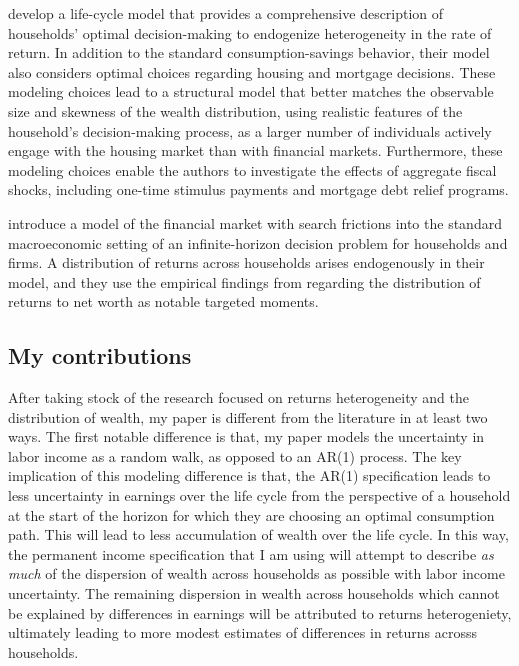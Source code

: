 \par \cite{Guler2022} develop a life-cycle model that provides a comprehensive description of households' optimal decision-making to endogenize heterogeneity in the rate of return. In addition to the standard consumption-savings behavior, their model also considers optimal choices regarding housing and mortgage decisions. These modeling choices lead to a structural model that better matches the observable size and skewness of the wealth distribution, using realistic features of the household's decision-making process, as a larger number of individuals actively engage with the housing market than with financial markets. Furthermore, these modeling choices enable the authors to investigate the effects of aggregate fiscal shocks, including one-time stimulus payments and mortgage debt relief programs.

\par \cite{Menzio2025} introduce a model of the financial market with search frictions into the standard macroeconomic setting of an infinite-horizon decision problem for households and firms. A distribution of returns across households arises endogenously in their model, and they use the empirical findings from \cite{aflgdmlp20} regarding the distribution of returns to net worth as notable targeted moments.

\subsection{My contributions}

\par After taking stock of the research focused on returns heterogeneity and the distribution of wealth, my paper is different from the literature in at least two ways. The first notable difference is that, my paper models the uncertainty in labor income as a random walk, as opposed to an AR(1) process. The key implication of this modeling difference is that, the AR(1) specification leads to less uncertainty in earnings over the life cycle from the perspective of a household at the start of the horizon for which they are choosing an optimal consumption path. This will lead to less accumulation of wealth over the life cycle. In this way, the permanent income specification that I am using will attempt to describe \textit{as much} of the dispersion of wealth across households as possible with labor income uncertainty. The remaining dispersion in wealth across households which cannot be explained by differences in earnings will be attributed to returns heterogeniety, ultimately leading to more modest estimates of differences in returns acrosss households.

